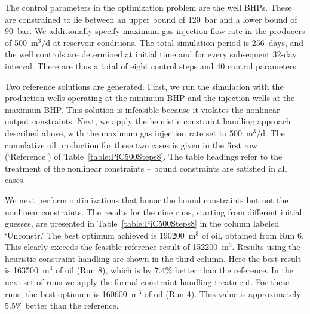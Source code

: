 \documentclass[twocolumn,numbook]{svjour3}          %
\begin{document}
The control parameters in the
optimization problem are the well BHPs. These are constrained to lie between an
upper bound of 120~bar and a lower bound of 90~bar. We additionally specify
maximum gas injection flow rate in the producers of 500~m$^3/$d at reservoir conditions.
The total simulation period is 256~days, and the well controls are determined
at initial time and for every subsequent 32-day interval. There are thus a
total of eight control steps and 40 control parameters.

Two reference solutions are  generated. First, we run the
simulation with the production wells operating at the minimum BHP and the
injection wells at the maximum BHP. This solution is infeasible because it
violates the nonlinear output constraints. Next, we apply the heuristic
constraint handling approach described above, with the maximum gas injection
rate set to 500~m$^3/$d. The cumulative oil production for these two cases is
given in the first row (`Reference') of Table~\ref{table:PiC500Steps8}. %
The table headings refer to the treatment of the
nonlinear constraints -- bound constraints are satisfied in all cases.


We next perform optimizations that honor the bound constraints but not the
nonlinear constraints. The results for the nine runs, starting from different
initial guesses, are presented in Table~\ref{table:PiC500Steps8} in the column
labeled `Unconstr.' The best optimum achieved is 190200~m$^3$ of oil, obtained
from Run 6.  This clearly exceeds the feasible reference result
of 152200~m$^3$. Results using the heuristic constraint handling are shown in
the third column. Here the best result is 163500~m$^3$ of oil (Run 8), which
is by 7.4\% better than the reference.
In the next set of runs we apply the formal constraint handling treatment. For
these runs, the best optimum is 160600~m$^3$ of oil (Run 4). This value is
approximately 5.5\% better than the reference.

\end{document}
